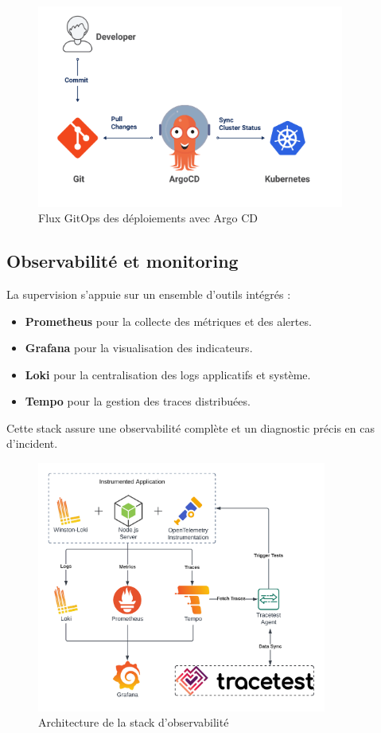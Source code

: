 \begin{figure}[H]
	\centering
	\includegraphics[width=0.9\textwidth]{figures/gitops-argo-cd.png}
	\caption{Flux GitOps des déploiements avec Argo CD}
\end{figure}

\subsection{Observabilité et monitoring}

La supervision s'appuie sur un ensemble d’outils intégrés :

\begin{itemize}
	\item \textbf{Prometheus} pour la collecte des métriques et des alertes.
	\item \textbf{Grafana} pour la visualisation des indicateurs.
	\item \textbf{Loki} pour la centralisation des logs applicatifs et système.
	\item \textbf{Tempo} pour la gestion des traces distribuées.
\end{itemize}

Cette stack assure une observabilité complète et un diagnostic précis en cas d’incident.

\begin{figure}[H]
	\centering
	\includegraphics[width=0.85\textwidth]{figures/observabilite-stack.png}
	\caption{Architecture de la stack d'observabilité}
\end{figure}

